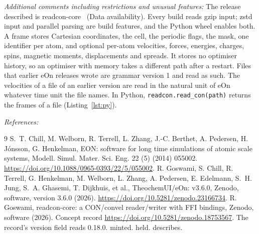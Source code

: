 \documentclass[preprint,12pt]{elsarticle}
\begin{document}
\begin{small}
\textit{Additional comments including restrictions and unusual features:}
The release described is readcon-core~\readconversion{} (Data
availability).
Every build reads gzip input; zstd input and parallel parsing are build
features, and the Python wheel enables both.
A frame stores Cartesian coordinates, the cell, the periodic flags, the
mask, one identifier per atom, and optional per-atom velocities, forces,
energies, charges, spins, magnetic moments, displacements and spreads.
It stores no optimiser history, so an optimiser with memory takes a
different path after a restart.
Files that earlier eOn releases wrote are grammar version 1 and read as
such.
The velocities of a file of an earlier version are read in the natural
unit of eOn whatever time unit the file names.
In Python, \texttt{readcon.read\_con(path)} returns the frames of a file
(Listing~\ref{lst:py}).

\textit{References:} \begin{thebibliography}{9}  S.~T.
Chill, M. Welborn, R. Terrell, L. Zhang, J.-C.
Berthet, A. Pedersen, H. J\'onsson, G. Henkelman, EON: software for long
time simulations of atomic scale systems, Modell. Simul. Mater. Sci.
Eng. 22 (5) (2014) 055002.
\url{https://doi.org/10.1088/0965-0393/22/5/055002}.
 R. Goswami, S. Chill, R. Terrell, G. Henkelman,
M. Welborn, L. Zhang, A. Pedersen, E. Edelmann, S.~H.
Jung, S.~A.
Ghasemi, T. Dijkhuis, et al., TheochemUI/eOn: v3.6.0, Zenodo, software,
version 3.6.0 (2026).
\url{https://doi.org/10.5281/zenodo.23166734}.
 R. Goswami, readcon-core: a
CON/convel reader/writer with FFI bindings, Zenodo, software (2026).
Concept record \url{https://doi.org/10.5281/zenodo.18753567}.
The record's version field reads 0.18.0.
minted.
held.
describes.
\end{thebibliography} \end{small}
\end{document}
